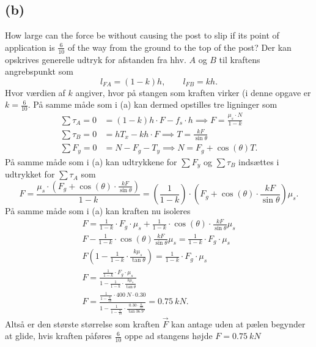 \documentclass[12pt]{article}
\theoremstyle{definition}
\begin{document}
\subsection*{(b)}
How large can the force be without causing the post to slip if its point of application is $\frac{6}{10}$ of the way from the ground to the top of the post?
\bigbreak
Der kan opskrives generelle udtryk for afstanden fra hhv. $A$ og $B$ til kraftens angrebspunkt som
\[ 
l_{FA} = (1-k)h, \qquad l_{FB} = kh
.\]
Hvor værdien af $k$ angiver, hvor på stangen som kraften virker (i denne opgave er $k = \frac{6}{10}$. På samme måde som i (a) kan dermed opstilles tre ligninger som
\begin{align*}
  \sum \tau_A = 0 &= (1-k)h\cdot F - f_s\cdot h \implies F = \frac{\mu_s \cdot N}{1-k} \\
  \sum \tau_B = 0 &= hT_x - kh\cdot F \implies T = \frac{kF}{\sin\theta} \\
  \sum F_y = 0 &= N - F_g - T_y \implies N = F_g + \cos(\theta)T
.\end{align*}
På samme måde som i (a) kan udtrykkene for $\sum F_y$ og $\sum \tau_B$ indsættes i udtrykket for $\sum \tau_A$ som
\[ 
F = \frac{\mu_s \cdot (F_g + \cos(\theta) \cdot \frac{kF}{\sin\theta})}{1-k} = \left( \frac{1}{1-k} \right) \cdot \left( F_g + \cos (\theta) \cdot \frac{kF}{\sin \theta} \right) \mu_s
.\]
På samme måde som i (a) kan kraften nu isoleres
\begin{gather*}
  F = \frac{1}{1-k} \cdot F_g \cdot \mu_s + \frac{1}{1-k} \cdot \cos (\theta) \cdot \frac{kF}{\sin \theta} \mu_s \\
  F - \frac{1}{1-k} \cdot \cos(\theta) \frac{kF}{\sin \theta} \mu_s = \frac{1}{1-k}\cdot F_g\cdot \mu_s \\
  F \left( 1 - \frac{1}{1-k} \cdot \frac{k\mu_s}{\tan \theta} \right) = \frac{1}{1-k} \cdot F_g \cdot \mu_s \\
  F = \frac{\frac{1}{1-k} \cdot F_g \cdot \mu_s}{1 - \frac{1}{1-k}\cdot \frac{k\mu_s}{\tan\theta}} \\
  F = \frac{\frac{1}{1 - \frac{6}{10}} \cdot \qty{400}{N} \cdot \num{0,30}}{1 - \frac{1}{1 - \frac{6}{10}} \cdot \frac{\num{0,30} \cdot \frac{6}{10}}{\tan \ang{36,9}}} = \qty{0,75}{kN} 
.\end{gather*}
Altså er den største størrelse som kraften $\Vec{F}$ kan antage uden at pælen begynder at glide, hvis kraften påføres $\frac{6}{10}$ oppe ad stangens højde \underline{\underline{$F = \qty{0,75}{kN}$}}
\end{document}

